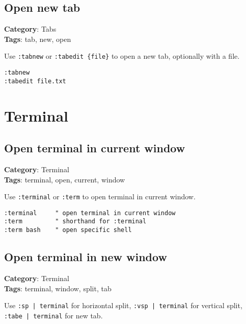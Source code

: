 {{{{{{{{{{{{{{\section{Open new tab}

\textbf{Category}: Tabs\\ \textbf{Tags}: tab, new, open
\vspace{0.5cm}

Use {\footnotesize \Verb§:tabnew§} or {\footnotesize \Verb§:tabedit {file}§} to open a new tab, optionally with a file.

\begin{Exa*}{}
\begin{Verbatim}[fontsize=\footnotesize, breaklines, breakanywhere]
:tabnew
:tabedit file.txt
\end{Verbatim}
\end{Exa*}

\chapter{Terminal}
\section{Open terminal in current window}

\textbf{Category}: Terminal\\ \textbf{Tags}: terminal, open, current, window
\vspace{0.5cm}

Use {\footnotesize \Verb§:terminal§} or {\footnotesize \Verb§:term§} to open terminal in current window.

\begin{Exa*}{}
\begin{Verbatim}[fontsize=\footnotesize, breaklines, breakanywhere]
:terminal     " open terminal in current window
:term         " shorthand for :terminal
:term bash    " open specific shell
\end{Verbatim}
\end{Exa*}

\section{Open terminal in new window}

\textbf{Category}: Terminal\\ \textbf{Tags}: terminal, window, split, tab
\vspace{0.5cm}

Use {\footnotesize \Verb§:sp | terminal§} for horizontal split, {\footnotesize \Verb§:vsp | terminal§} for vertical split, {\footnotesize \Verb§:tabe | terminal§} for new tab.

}}}}}}}}}}}}}}

